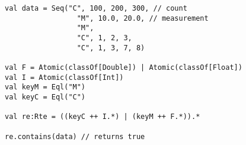 \begin{lstlisting}[style=scalaioScala]
val data = Seq("C", 100, 200, 300, // count
                 "M", 10.0, 20.0, // measurement
                 "M",
                 "C", 1, 2, 3,
                 "C", 1, 3, 7, 8)

val F = Atomic(classOf[Double]) | Atomic(classOf[Float])
val I = Atomic(classOf[Int])
val keyM = Eql("M")
val keyC = Eql("C")

val re:Rte = ((keyC ++ I.*) | (keyM ++ F.*)).*

re.contains(data) // returns true
\end{lstlisting}
